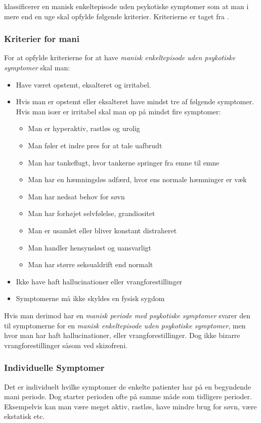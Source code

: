 \citet{misc:netpsykmani} klassificerer en manisk enkeltepisode uden psykotiske symptomer som at man i mere end en uge skal opfylde følgende kriterier.
Kriterierne er taget fra \citet{misc:netpsykmani}.
\begin{mdframed}
\subsubsection{Kriterier for mani}
For at opfylde kriterierne for at have \textit{manisk enkeltepisode uden psykotiske symptomer} skal man:
\begin{itemize}
	\item Have været opstemt, eksalteret og irritabel.
	\item Hvis man er opstemt eller eksalteret have mindst tre af følgende symptomer. Hvis man især er irritabel skal man op på mindst fire symptomer:
	\begin{itemize}
		\item Man er hyperaktiv, rastløs og urolig
		\item Man føler et indre pres for at tale uafbrudt
		\item Man har tankeflugt, hvor tankerne springer fra emne til emne
		\item Man har en hæmningsløs adfærd, hvor ens normale hæmninger er væk
		\item Man har nedsat behov for søvn
		\item Man har forhøjet selvfølelse, grandiositet
		\item Man er usamlet eller bliver konstant distraheret
		\item Man handler hensynsløst og uansvarligt
		\item Man har større seksualdrift end normalt
	\end{itemize}
	\item Ikke have haft hallucinationer eller vrangforestillinger
	\item Symptomerne må ikke skyldes en fysisk sygdom
\end{itemize}
\end{mdframed}
Hvis man derimod har en \textit{manisk periode med psykotiske symptomer} svarer den til symptomerne for en \textit{manisk enkeltepisode uden psykotiske symptomer}, men hvor man har haft hallucinationer, eller vrangforestillinger. Dog ikke bizarre vrangforestillinger såsom ved skizofreni.

\subsubsection{Individuelle Symptomer}
Det er individuelt hvilke symptomer de enkelte patienter har på en begyndende mani periode.
Dog starter perioden ofte på samme måde som tidligere perioder.
Eksempelvis kan man være meget aktiv, rastløs, have mindre brug for søvn, være ekstatisk etc.

